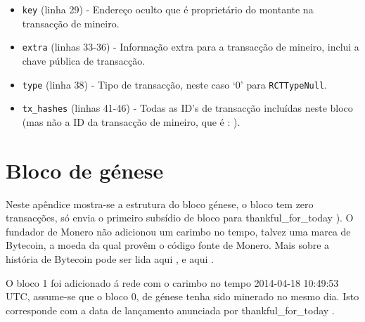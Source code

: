 \begin{appendices}
\begin{itemize}
    \item {\tt key} (linha 29) - Endereço oculto que é proprietário do montante na transacção de mineiro.
    \item {\tt extra} (linhas 33-36) - Informação extra para a transacção de mineiro, inclui a chave pública de transacção.
    \item {\tt type} (linha 38) - Tipo de transacção, neste caso `0' para {\tt RCTTypeNull}.  
    \item {\tt tx\_hashes} (linhas 41-46) - Todas as ID's de transacção incluídas neste bloco (mas não a ID da transacção de mineiro, que é : ).
\end{itemize}

\chapter{Bloco de génese}
\label{appendix:genesis-block}

Neste apêndice mostra-se a estrutura do bloco génese, o bloco tem zero transacções, só envia o primeiro subsídio de bloco para thankful\_for\_today \cite{bitmonero-launched}). O fundador de Monero não adicionou um carimbo no tempo, talvez uma marca de Bytecoin, a moeda da qual provêm o código fonte de Monero. Mais sobre a história de Bytecoin pode ser lida aqui \cite{monero-history}, e aqui \cite{bytecoin-network}.  

O bloco 1 foi adicionado á rede com o carimbo no tempo 2014-04-18 10:49:53 UTC, assume-se que o bloco 0, de génese tenha sido minerado no mesmo dia. Isto corresponde com a data de lançamento anunciada por thankful\_for\_today \cite{bitmonero-launched}.


\end{appendices}
